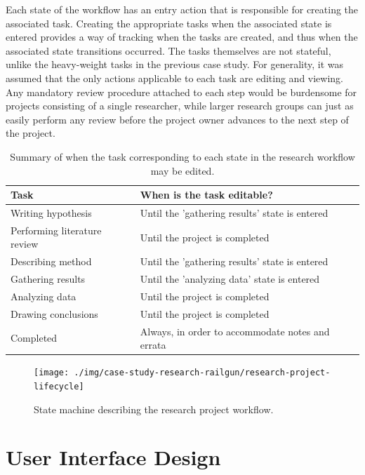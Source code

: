 \documentclass[document.tex]{subfiles}
\begin{document}
Each state of the workflow has an entry action that is responsible for creating the associated task. Creating the appropriate tasks when the associated state is entered provides a way of tracking when the tasks are created, and thus when the associated state transitions occurred. The tasks themselves are not stateful, unlike the heavy-weight tasks in the previous case study. For generality, it was assumed that the only actions applicable to each task are editing and viewing. Any mandatory review procedure attached to each step would be burdensome for projects consisting of a single researcher, while larger research groups can just as easily perform any review before the project owner advances to the next step of the project.

\begin{table}
  \centering
  \caption{Summary of when the task corresponding to each state in the research workflow may be edited.}
  \label{tbl:case-research-edit-policies}
  \tablespacer
  \begin{tabular}{ l l }
    \toprule
    Task & When is the task editable? \\
    \midrule
    Writing hypothesis & Until the 'gathering results' state is entered \\
    Performing literature review & Until the project is completed \\
    Describing method & Until the 'gathering results' state is entered \\
    Gathering results & Until the 'analyzing data' state is entered \\
    Analyzing data & Until the project is completed \\
    Drawing conclusions & Until the project is completed \\
    Completed & Always, in order to accommodate notes and errata \\
    \bottomrule
  \end{tabular}
\end{table}

\begin{figure}[!ht]
\centering \texttt{[image: ./img/case-study-research-railgun/research-project-lifecycle]}
\caption{State machine describing the research project workflow.}
\label{fig:case-research-design-project-workflow}
\end{figure}

\FloatBarrier

\section {User Interface Design}
\label {sec:case-research-ui-design}
\end{document}
